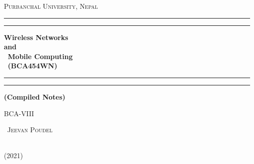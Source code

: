 	\thispagestyle{empty}%
\begin{titlepage}
	

	\centering
	
	
	{\scshape\LARGE Purbanchal University, Nepal \par}
	\vspace{0.5cm}
	\vspace*{\baselineskip} %
	
	\rule{\textwidth}{1.6pt}\vspace*{-\baselineskip}\vspace*{2pt} %
	\rule{\textwidth}{0.4pt} %
	
	\vspace{0.75\baselineskip} %
	
	{\Huge{\bfseries Wireless Networks \\ and \\ ~{Mobile Computing}\\ ~{(BCA454WN)}}\\}
	
	\vspace{0.75\baselineskip} %
	
	\rule{\textwidth}{0.4pt}\vspace*{-\baselineskip}\vspace{3.2pt} %
	\rule{\textwidth}{1.6pt} %
	
	\vspace{2\baselineskip} %

	
	{\normalsize \bfseries (Compiled Notes)}
	
	\vspace{2cm}
	
	{\Large\scshape BCA-VIII \par}
	
	\vfill
	
	{\Huge\scshape ~{Jeevan Poudel}\par}
	
	\vfill
	
\vspace{0.3\baselineskip} 
{\large ~{\vspace*{0.1cm} \\(2021)} \par} 


\end{titlepage}
